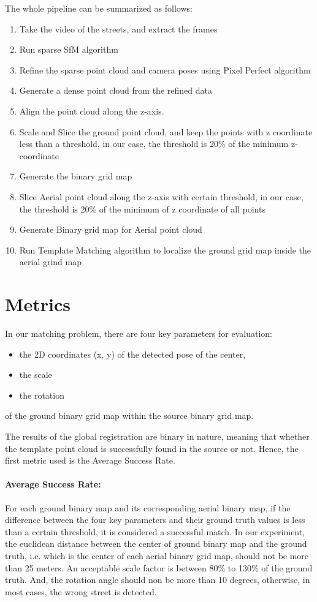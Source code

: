 \documentclass[11pt]{article}
\begin{document}
    The whole pipeline can be summarized as follows:
    \begin{enumerate}
        \item Take the video of the streets, and extract the frames
        \item Run sparse SfM algorithm
        \item Refine the sparse point cloud and camera poses using Pixel Perfect algorithm
        \item Generate a dense point cloud from the refined data
        \item Align the point cloud along the z-axis.
        \item Scale and Slice the ground point cloud, and keep the points with z coordinate less than a threshold,
        in our case, the threshold is 20\% of the minimum z-coordinate
        \item Generate the binary grid map
        \item Slice Aerial point cloud along the z-axis with certain threshold, in our case, the threshold is 20\%
        of the minimum of z coordinate of all points
        \item Generate Binary grid map for Aerial point cloud
        \item Run Template Matching algorithm to localize the ground grid map inside the aerial grind map
    \end{enumerate}

    \section{Metrics}
    In our matching problem, there are four key parameters for evaluation:
    \begin{itemize}
        \item the 2D coordinates (x, y) of the detected pose of the center,
        \item the scale
        \item the rotation
    \end{itemize}
    of the ground binary grid map within the source binary grid map.

    The results of the global registration are binary in nature, meaning that whether the template point cloud
    is successfully found in the source or not. Hence, the first metric used is the Average Success Rate.
    \paragraph{Average Success Rate:} For each ground binary map and its corresponding aerial binary map, if the difference
    between the four key parameters and their ground truth values is less than a certain threshold, it is considered
    a successful match. In our experiment, the euclidean distance between the center of ground binary map and the ground
    truth, i.e. which is the center of each aerial binary grid map, should not be more than 25 meters. An acceptable
    scale factor is between 80\% to 130\% of the ground truth. And, the rotation angle should non be more than 10
    degrees, otherwise, in most cases, the wrong street is detected.
\end{document}
